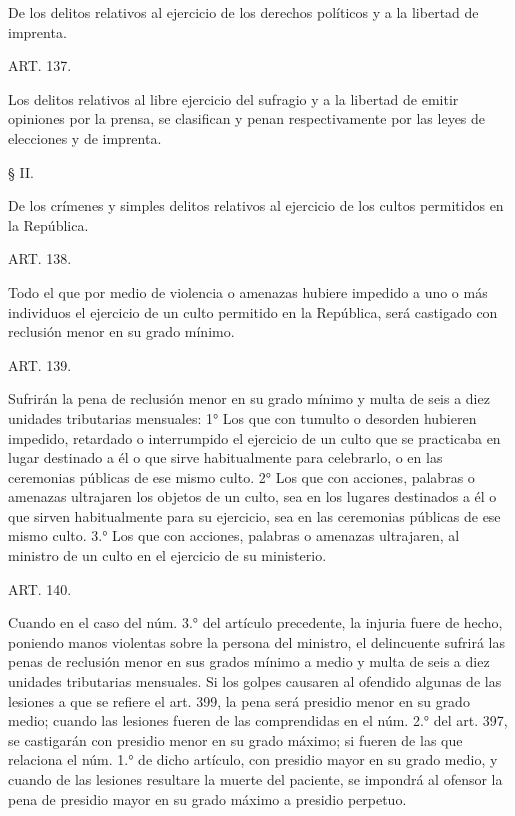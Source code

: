 De los delitos relativos al ejercicio de los derechos políticos y a la libertad de imprenta.





    ART. 137.

    Los delitos relativos al libre ejercicio del sufragio y a la libertad de emitir opiniones por la prensa, se clasifican y penan respectivamente por las leyes de elecciones y de imprenta.


    § II.

    De los crímenes y simples delitos relativos al ejercicio de los cultos permitidos en la República.





    ART. 138.

    Todo el que por medio de violencia o amenazas hubiere impedido a uno o más individuos el ejercicio de un culto permitido en la República, será castigado con reclusión menor en su grado mínimo.



    ART. 139.

    Sufrirán la pena de reclusión menor en su grado mínimo y multa de seis a diez unidades tributarias mensuales:
    1° Los que con tumulto o desorden hubieren impedido, retardado o interrumpido el ejercicio de un culto que se practicaba en lugar destinado a él o que sirve habitualmente para celebrarlo, o en las ceremonias públicas de ese mismo culto.
    2° Los que con acciones, palabras o amenazas ultrajaren los objetos de un culto, sea en los lugares destinados a él o que sirven habitualmente para su ejercicio, sea en las ceremonias públicas de ese mismo culto.
    3.° Los que con acciones, palabras o amenazas ultrajaren, al ministro de un culto en el ejercicio de su ministerio.





    ART. 140. 

    Cuando en el caso del núm. 3.° del artículo precedente, la injuria fuere de hecho, poniendo manos violentas sobre la persona del ministro, el delincuente sufrirá las penas de reclusión menor en sus grados mínimo a medio y multa de seis a diez unidades tributarias mensuales.
    Si los golpes causaren al ofendido algunas de las lesiones a que se refiere el art. 399, la pena será presidio menor en su grado medio; cuando las lesiones fueren de las comprendidas en el núm. 2.° del art. 397, se castigarán con presidio menor en su grado máximo; si fueren de las que relaciona el núm. 1.° de dicho artículo, con presidio mayor en su grado medio, y cuando de las lesiones resultare la muerte del paciente, se impondrá al ofensor la pena de presidio mayor en su grado máximo a presidio perpetuo.








